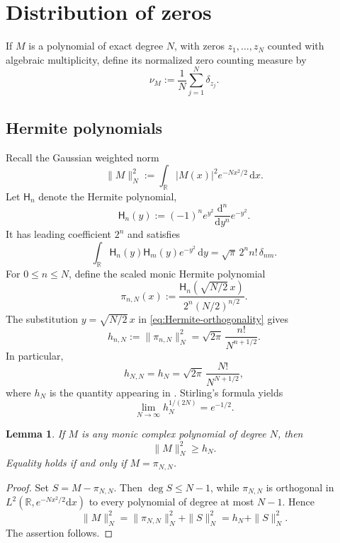 \documentclass[11pt,reqno]{amsart}
\numberwithin{equation}{section}
\newtheorem{lemma}[theorem]{Lemma}
\theoremstyle{definition}
\theoremstyle{remark}
\newcommand{\R}{\mathbb R}
\newcommand{\1}{\mathbf 1}
\newcommand{\dd}{\mathrm d}
\begin{document}
\section{Distribution of zeros}

If \(M\) is a polynomial of exact degree \(N\), with zeros
\(z_1,\dots,z_N\) counted with algebraic multiplicity, define its normalized
zero counting measure by
\[
  \nu_M:=\frac1N\sum_{j=1}^N\delta_{z_j}.
\]

\subsection{Hermite polynomials}

Recall the Gaussian weighted norm
\[
  \|M\|_N^2
  :=
  \int_{\R}|M(x)|^2e^{-Nx^2/2}\,\dd x.
\]
Let \(\mathsf H_n\) denote the  Hermite polynomial,
\[
  \mathsf H_n(y)
  :=
  (-1)^ne^{y^2}\frac{\dd^n}{\dd y^n}e^{-y^2}.
\]
It has leading coefficient \(2^n\) and satisfies
\begin{equation}\label{eq:Hermite-orthogonality}
  \int_{\R}\mathsf H_n(y)\mathsf H_m(y)e^{-y^2}\,\dd y
  =
  \sqrt\pi\,2^n n!\,\delta_{nm}.
\end{equation}
For \(0\le n\le N\), define the scaled monic Hermite polynomial
\begin{equation}\label{eq:scaled-monic-Hermite}
  \pi_{n,N}(x)
  :=
  \frac{\mathsf H_n\!\left(\sqrt{N/2}\,x\right)}
       {2^n(N/2)^{n/2}}.
\end{equation}
The substitution \(y=\sqrt{N/2}\,x\) in
\eqref{eq:Hermite-orthogonality} gives
\begin{equation}\label{eq:scaled-Hermite-norm}
  h_{n,N}
  :=
  \|\pi_{n,N}\|_N^2
  =
  \sqrt{2\pi}\,\frac{n!}{N^{n+1/2}}.
\end{equation}
In particular,
\[
  h_{N,N}=h_N
  =
  \sqrt{2\pi}\,\frac{N!}{N^{N+1/2}},
\]
where \(h_N\) is the quantity appearing in .
Stirling's formula yields
\begin{equation}\label{eq:Hermite-norm-root}
  \lim_{N\to\infty}h_N^{1/(2N)}=e^{-1/2}.
\end{equation}

\begin{lemma}\label{lem:least-monic-L2}
If \(M\) is any monic complex polynomial of degree \(N\), then
\[
  \|M\|_N^2\ge h_N.
\]
Equality holds if and only if \(M=\pi_{N,N}\).
\end{lemma}

\begin{proof}
Set \(S=M-\pi_{N,N}\).  Then \(\deg S\le N-1\), while
\(\pi_{N,N}\) is orthogonal in
\(L^2(\R,e^{-Nx^2/2}\dd x)\) to every polynomial of degree at most
\(N-1\).  Hence
\[
  \|M\|_N^2
  =
  \|\pi_{N,N}\|_N^2+\|S\|_N^2
  =
  h_N+\|S\|_N^2.
\]
The assertion follows.
\end{proof}
\end{document}
